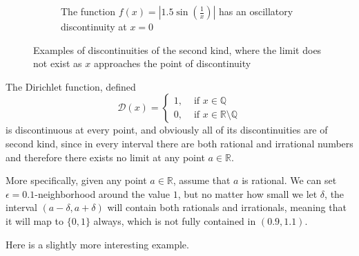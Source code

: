\begin{definition}
\begin{figure}[H]
\begin{subfigure}[b]{0.48\textwidth}
        \caption{The function $f(x) = |1.5 \sin\left(\frac{1}{x}\right)|$ has an oscillatory discontinuity at $x=0$}
        \label{fig:oscillatory-discontinuity}
      \end{subfigure}
      \caption{Examples of discontinuities of the second kind, where the limit does not exist as $x$ approaches the point of discontinuity}
      \label{fig:second-kind-discontinuities}
    \end{figure}
  \end{definition}

  \begin{example}
    The Dirichlet function, defined
    \begin{equation}
      \mathcal{D}(x) = \begin{cases}
      1, & \text{ if } x \in \mathbb{Q} \\
      0, & \text{ if } x \in \mathbb{R} \setminus \mathbb{Q} 
      \end{cases}
    \end{equation}
    is discontinuous at every point, and obviously all of its discontinuities are of second kind, since in every interval there are both rational and irrational numbers and therefore there exists no limit at any point $a \in \mathbb{R}$. 

    More specifically, given any point $a \in \mathbb{R}$, assume that $a$ is rational. We can set $\epsilon = 0.1$-neighborhood around the value $1$, but no matter how small we let $\delta$, the interval $(a - \delta, a + \delta)$ will contain both rationals and irrationals, meaning that it will map to $\{0,1\}$ always, which is not fully contained in $(0.9, 1.1)$.  
  \end{example}

  Here is a slightly more interesting example. 

